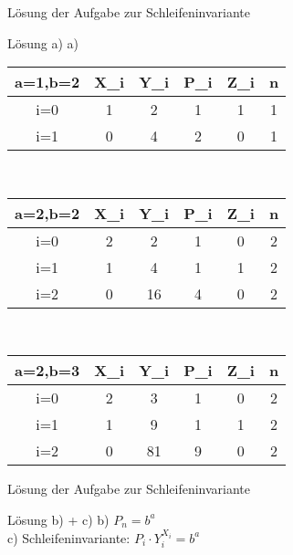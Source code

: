 \begin{frame}{Lösung der Aufgabe zur Schleifeninvariante}
	\begin{block}{Lösung a)}
	\small
	a)
		\begin{center}\begin{tabular}{C C C C C C}
			 	a=1,b=2&X_i&Y_i&P_i&Z_i&n\\
				\hline
				i=0&1&2&1&1&1\\
				i=1&0&4&2&0&1\\
			\end{tabular}\\[10pt]
		\begin{tabular}{C C C C C C}
			 	a=2,b=2&X_i&Y_i&P_i&Z_i&n\\
				\hline
				i=0&2&2&1&0&2\\
				i=1&1&4&1&1&2\\
				i=2&0&16&4&0&2\\
		\end{tabular}\\[10pt]
		\begin{tabular}{C C C C C C}
			 	a=2,b=3&X_i&Y_i&P_i&Z_i&n\\
				\hline
				i=0&2&3&1&0&2\\
				i=1&1&9&1&1&2\\
				i=2&0&81&9&0&2\\
			\end{tabular}\end{center}
	\end{block}
\end{frame}

\begin{frame}{Lösung der Aufgabe zur Schleifeninvariante}
	\begin{block}{Lösung b) + c)}
		b) $P_n = b^{a}$\\
		c) Schleifeninvariante: $P_i \cdot Y_{i}^{X_i} = b^{a}$
	\end{block}
\end{frame}